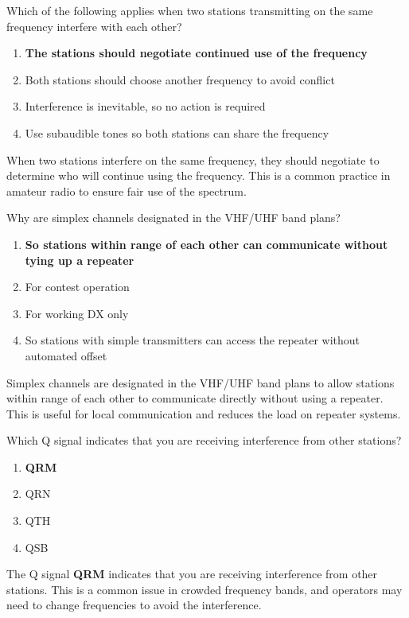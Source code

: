 
\begin{tcolorbox}[colback=gray!10!white,colframe=black!75!black,title={T2B08}]
    Which of the following applies when two stations transmitting on the same frequency interfere with each other?
    \begin{enumerate}[label=\Alph*),noitemsep]
        \item \textbf{The stations should negotiate continued use of the frequency}
        \item Both stations should choose another frequency to avoid conflict
        \item Interference is inevitable, so no action is required
        \item Use subaudible tones so both stations can share the frequency
    \end{enumerate}
\end{tcolorbox}
When two stations interfere on the same frequency, they should negotiate to determine who will continue using the frequency. This is a common practice in amateur radio to ensure fair use of the spectrum.


\begin{tcolorbox}[colback=gray!10!white,colframe=black!75!black,title={T2B09}]
    Why are simplex channels designated in the VHF/UHF band plans?
    \begin{enumerate}[label=\Alph*),noitemsep]
        \item \textbf{So stations within range of each other can communicate without tying up a repeater}
        \item For contest operation
        \item For working DX only
        \item So stations with simple transmitters can access the repeater without automated offset
    \end{enumerate}
\end{tcolorbox}
Simplex channels are designated in the VHF/UHF band plans to allow stations within range of each other to communicate directly without using a repeater. This is useful for local communication and reduces the load on repeater systems.


\begin{tcolorbox}[colback=gray!10!white,colframe=black!75!black,title={T2B10}]
    Which Q signal indicates that you are receiving interference from other stations?
    \begin{enumerate}[label=\Alph*),noitemsep]
        \item \textbf{QRM}
        \item QRN
        \item QTH
        \item QSB
    \end{enumerate}
\end{tcolorbox}
The Q signal \textbf{QRM} indicates that you are receiving interference from other stations. This is a common issue in crowded frequency bands, and operators may need to change frequencies to avoid the interference.


